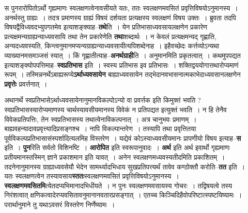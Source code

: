\documentclass[article,12pt,a4paper]{memoir}
\begin{document}
	स पुनरारोपितोऽर्थो गृह्यमाणः स्वलक्षणत्वेनावसीयते यतः, ततः स्वलक्षणमवसितं प्रवृत्तिविषयोऽनुमानस्य । अनर्थस्तु ग्राह्यः । तदत्र प्रमाणस्य ग्राह्यं विषयं दर्शयता प्रत्यक्षस्य स्वलक्षणं विषय उक्तः । ब्रुवता तदपि विषयद्वैविध्यवदभ्युपगतमेव इत्याशङ्क्याह--\textbf{तथे}ति । येन प्रतिभासाध्यवसायलक्षणेन प्रकारेण प्रत्यक्षमन्यग्राह्यन्याध्यवसायि तथा तेन प्रकारेणेति \textbf{तथा}शब्दार्थः । न केवलं प्रत्यक्षमन्यद् गृह्णाति, अन्यदध्यवस्यति, किन्त्वनुमानमप्यन्यग्राह्यन्याध्यवसायीत्यपिशब्देनाह । इहैवच्छेदः कर्त्तव्योऽन्यथा व्याख्यानमसमञ्जसं स्यात् । किं गृह्णातीत्याह--\textbf{अनर्थग्राही}ति । अनुमानमिति प्रकृतत्वात् । कथमुपपद्यत इत्याशङ्क्योपपत्तिमाह--\textbf{स्वप्रतिभास} इति । स्वस्य प्रतिभास इव प्रतिभासः । शक्तिद्वययोगात्तथारोप्यमाणं रूपम् । तस्मिन्ननर्थेऽबाह्यरूप्ये\textbf{ऽर्थाध्यवसायेन} बाह्याध्यवसायेन तद्भेदानवभासनात्मकाभेदाध्यवसानलक्षणेन \textbf{प्रवृत्तेः} प्रवर्त्तनात् ।
	\pend
      

	  \pstart अथानर्थे स्वप्रतिभासेऽर्थाध्यवसायेनानुमानविकल्पोऽन्यो वा प्रवर्त्तक इति किमुक्तं भवति ? स्वप्रतिभासस्यारोप्यमाणस्य चार्थस्यावसीयमानस्य विवेकं न प्रतिपद्यत इत्युक्तं भवति । न हि तेनैव विवेकप्रतिपत्तिः, तेन स्वप्रतिभासस्य तथात्वेनाविकल्पनात् । अत्र चानुभवः प्रमाणम् । बाह्यवहन्यादावप्रवृत्त्यादिप्रसङ्गश्च । नापि विकल्पान्तरेण । तस्यापि तथा प्रवृत्तितया पूर्वविकल्पप्रतिभासासंस्पर्शादित्यलमिह विस्तरेण । यद्येवं कोऽस्याध्यवसीयमानः प्रापणीयो विषय इत्याह--\textbf{स} इति । \textbf{पुन}रिति सर्वतो विशिनष्टि । \textbf{आरोपित} इति स्वरूपानुवादः । \textbf{अर्थ} इति अर्थ इवार्थो गृह्यमाणः प्रतीयमानस्तस्मिन् ज्ञाने प्रकाशमान इति यावत् । अनेन स्वलक्षणमध्यवस्यतीदमिति प्रकाशितम् । तदनेनानुमानस्य ग्राह्याध्यवसेयौ भेदेन सामर्थ्यादभिधाय सुखप्रतिपत्त्यर्थं तावेव कण्ठोक्तौ करोति--\textbf{तत} इति । यतः स्वलक्षणत्वेन तस्यावसाय\textbf{स्ततः}\leavevmode{}स्वलक्षणमवसितं प्रवृत्तिविषयोऽनुमानस्य । \textbf{स्वलक्षणमवसितमि}त्येतदप्यभिमानादभिधीयते । न पुनः स्वलक्षणमवसायस्य गोचरः । तद्विषयत्वे तस्य निरंशत्वात् क्षणिकत्वादेरप्यवसितावनुमानानवतारप्रसङ्गात् । एतच्च किञ्चिदिहैवोपरिष्टात्स्पष्टयिष्यामः । परार्थानुमाने तु यथाऽवसरं विस्तरेण निर्णेष्यामः ।
	\pend
      
\end{document}
